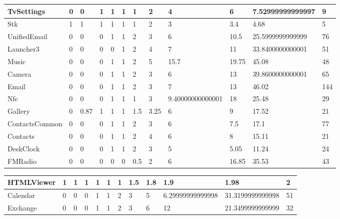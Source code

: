 \begin{tabular}{|l|l|l|l|l|l|l|l|l|l|l|l|}
TvSettings&0&0&1&1&1&1&2&4&6&7.52999999999997&9\\
\hline
Stk&1&1&1&1&1&1&2&3&3.4&4.68&5\\
\hline
UnifiedEmail&0&0&0&1&1&2&3&6&10.5&25.5999999999999&76\\
\hline
Launcher3&0&0&0&0&1&2&4&7&11&33.8400000000001&51\\
\hline
Music&0&0&0&1&1&2&5&15.7&19.75&45.08&48\\
\hline
Camera&0&0&0&1&1&2&3&6&13&39.8600000000001&65\\
\hline
Email&0&0&0&1&1&2&3&7&13&46.02&144\\
\hline
Nfc&0&0&0&1&1&1&3&9.40000000000001&18&25.48&29\\
\hline
Gallery&0&0.87&1&1&1&1.5&3.25&6&9&17.52&21\\
\hline
ContactsCommon&0&0&0&1&1&2&3&6&7.5&17.1&77\\
\hline
Contacts&0&0&0&1&1&2&4&6&8&15.11&21\\
\hline
DeskClock&0&0&0&1&1&2&3&5&5.05&11.24&24\\
\hline
FMRadio&0&0&0&0&0&0.5&2&6&16.85&35.53&43\\
\hline
\end{tabular}
\newline
\begin{tabular}{|l|l|l|l|l|l|l|l|l|l|l|l|}
\hline
HTMLViewer&1&1&1&1&1&1&1.5&1.8&1.9&1.98&2\\
\hline
Calendar&0&0&0&1&1&2&3&5&6.29999999999998&31.3199999999998&51\\
\hline
Exchange&0&0&0&1&1&2&3&6&12&21.3499999999999&32\\
\hline
\end{tabular}
